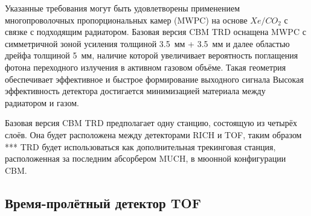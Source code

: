 Указанные требования могут быть удовлетворены применением многопроволочных пропорциональных камер (MWPC) на основе $ Xe/CO_{2} $ с связке с подходящим радиатором. Базовая версия CBM TRD оснащена MWPC с симметричной зоной усиления толщиной 3.5~мм + 3.5~мм и далее областью дрейфа толщиной 5~мм, наличие которой увеличивает вероятность поглащения фотона переходного излучения в активном газовом объёме. Такая геометрия обеспечивает эффективное и быстрое формирование выходного сигнала
Высокая эффективность детектора достигается минимизацией материала между радиатором и газом.


Базовая версия CBM TRD предполагает одну станцию, состоящую из четырёх слоёв.
Она будет расположена между детекторами RICH и TOF, таким образом ***
TRD будет использоваться как дополнительная трекинговая станция, расположенная за последним абсорбером MUCH, в мюонной конфигурации CBM.



\subsection{Время-пролётный детектор TOF}\label{sec:secTOF}

